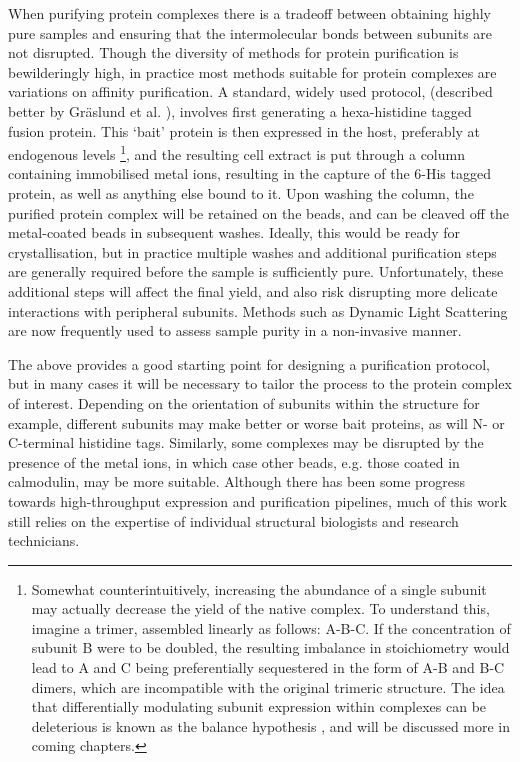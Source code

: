 \documentclass[a4paper,11pt,twoside,openright]{scrbook}
\begin{document}
When purifying protein complexes there is a tradeoff between obtaining highly pure samples and ensuring that the intermolecular bonds between subunits are not disrupted. Though the diversity of methods for protein purification is bewilderingly high, in practice most methods suitable for protein complexes are variations on affinity purification. A standard, widely used protocol, (described better by Gr{\"a}slund et al. \cite{Graslund2008}), involves first generating a hexa-histidine tagged fusion protein. This `bait' protein is then expressed in the host, preferably at endogenous levels
\footnote{Somewhat counterintuitively, increasing the abundance of a single subunit may actually decrease the yield of the native complex. To understand this, imagine a trimer, assembled linearly as follows: A-B-C. If the concentration of subunit B were to be doubled, the resulting imbalance in stoichiometry would lead to A and C being preferentially sequestered in the form of A-B and B-C dimers, which are incompatible with the original trimeric structure. The idea that differentially modulating subunit expression within complexes can be deleterious is known as the balance hypothesis \cite{Papp2003}, and will be discussed more in coming chapters.},
and the resulting cell extract is put through a column containing immobilised metal ions, resulting in the capture of the 6-His tagged protein, as well as anything else bound to it. Upon washing the column, the purified protein complex will be retained on the beads, and can be cleaved off the metal-coated beads in subsequent washes. Ideally, this would be ready for crystallisation, but in practice multiple washes and additional purification steps are generally required before the sample is sufficiently pure. Unfortunately, these additional steps will affect the final yield, and also risk disrupting more delicate interactions with peripheral subunits. Methods such as Dynamic Light Scattering are now frequently used to assess sample purity in a non-invasive manner.

The above provides a good starting point for designing a purification protocol, but in many cases it will be necessary to tailor the process to the protein complex of interest. Depending on the orientation of subunits within the structure for example, different subunits may make better or worse bait proteins, as will N- or C-terminal histidine tags. Similarly, some complexes may be disrupted by the presence of the metal ions, in which case other beads, e.g. those coated in calmodulin, may be more suitable. Although there has been some progress towards high-throughput expression and purification pipelines, much of this work still relies on the expertise of individual structural biologists and research technicians.
\end{document}
